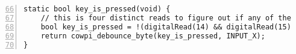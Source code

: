 \renewcommand{\firstline}{66}
\begin{lstlisting}[numberstyle=\color{gray}, numbers=left, firstnumber=\firstline, escapechar=`]
static bool key_is_pressed(void) {
    // this is four distinct reads to figure out if any of the column pins has a 0 on it -- can you do it in one read?
    bool key_is_pressed = !(digitalRead(14) && digitalRead(15) && digitalRead(16) && digitalRead(17));  `\label{code:readColumns}`
    return cowpi_debounce_byte(key_is_pressed, INPUT_X);
}
\end{lstlisting}

